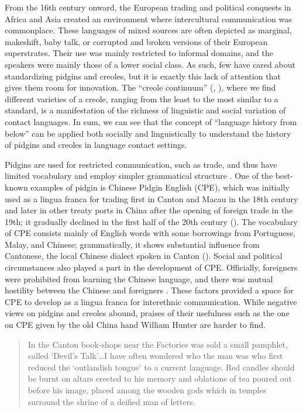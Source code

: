 \documentclass[output=paper]{langsci/langscibook}
\begin{document}
From the 16th century onward, the European trading and political conquests in Africa and Asia created an environment where intercultural communication was commonplace. These languages of mixed sources are often depicted as marginal, makeshift, baby talk, or corrupted and broken versions of their European superstrates. Their use was mainly restricted to informal domains, and the speakers were mainly those of a lower social class. As such, few have cared about standardizing pidgins and creoles, but it is exactly this lack of attention that gives them room for innovation. The “creole continuum” (\citealt{stewart_urban_1965}, \citealt{bickerton_dynamics_1975}), where we find different varieties of a creole, ranging from the least to the most similar to a standard, is a manifestation of the richness of linguistic and social variation of contact languages. In sum, we can see that the concept of “language history from below” can be applied both socially and linguistically to understand the history of pidgins and creoles in language contact settings. 

Pidgins are used for restricted communication, such as trade, and thus have limited vocabulary and employ simpler grammatical structure \citep[5]{holm_introduction_2000}. One of the best-known examples of pidgin is Chinese Pidgin English (CPE), which was initially used as a lingua franca for trading first in Canton and Macau in the 18th century and later in other treaty ports in China after the opening of foreign trade in the 19th; it gradually declined in the first half of the 20th century (\citealt{michaelis_chinese_2013}). The vocabulary of CPE consists mainly of English words with some borrowings from Portuguese, Malay, and Chinese; grammatically, it shows substantial influence from Cantonese, the local Chinese dialect spoken in Canton (\citealt{ansaldo_china_2010}). Social and political circumstances also played a part in the development of CPE. Officially, foreigners were prohibited from learning the Chinese language, and there was mutual hostility between the Chinese and foreigners \citep{baker_off_1990}. These factors provided a space for CPE to develop as a lingua franca for interethnic communication. While negative views on pidgins and creoles abound, praises of their usefulness such as the one on CPE given by the old China hand William Hunter are harder to find.

\begin{quote}
    In the Canton book-shops near the Factories was sold a small pamphlet, called ‘Devil’s Talk’…I have often wondered who the man was who first reduced the ‘outlandish tongue’ to a current language. Red candles should be burnt on altars erected to his memory and oblations of tea poured out before his image, placed among the wooden gods which in temples surround the shrine of a deified man of letters. \citep[63]{hunter_fan_1882}  
\end{quote}
\end{document}
